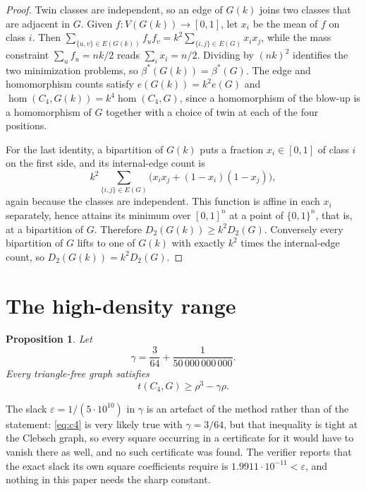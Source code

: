 \documentclass[11pt,reqno]{amsart}
\theoremstyle{plain}
\newtheorem{proposition}[theorem]{Proposition}
\newcommand{\optf}{\beta^{*}}
\newcommand{\dens}{\rho}
\begin{document}
\begin{proof}
Twin classes are independent, so an edge of $G(k)$ joins two classes that are
adjacent in $G$.  Given $f:V(G(k))\to[0,1]$, let $x_i$ be the mean of $f$ on
class $i$.  Then
$\sum_{\{u,v\}\in E(G(k))}f_uf_v=k^{2}\sum_{\{i,j\}\in E(G)}x_ix_j$, while the mass
constraint $\sum_uf_u=nk/2$ reads $\sum_ix_i=n/2$.  Dividing by $(nk)^{2}$
identifies the two minimization problems, so $\optf(G(k))=\optf(G)$.  The edge and
homomorphism counts satisfy $e(G(k))=k^{2}e(G)$ and
$\hom(C_4,G(k))=k^{4}\hom(C_4,G)$, since a
homomorphism of the blow-up is a homomorphism of $G$ together with a choice of
twin at each of the four positions.

For the last identity, a bipartition of $G(k)$ puts a fraction $x_i\in[0,1]$
of class $i$ on the first side, and its internal-edge count is
\[
 k^{2}\sum_{\{i,j\}\in E(G)}\bigl(x_ix_j+(1-x_i)(1-x_j)\bigr),
\]
again because the classes are independent.  This function is affine in each
$x_i$ separately, hence attains its minimum over $[0,1]^{n}$ at a point of
$\{0,1\}^{n}$, that is, at a bipartition of $G$.  Therefore
$D_2(G(k))\ge k^{2}D_2(G)$.  Conversely every bipartition of $G$ lifts to one
of $G(k)$ with exactly $k^{2}$ times the internal-edge count, so
$D_2(G(k))=k^{2}D_2(G)$.
\end{proof}

\section{The high-density range}\label{sec:high}

\begin{proposition}\label{prop:c4}
Let
\[
 \gamma=\frac3{64}+\frac1{50\,000\,000\,000}.
\]
Every triangle-free graph satisfies
\begin{equation}\label{eq:c4}
 t(C_4,G)\ge\dens^{3}-\gamma\dens.
\end{equation}
\end{proposition}

The slack $\varepsilon=1/(5\cdot10^{10})$ in $\gamma$ is an artefact of the
method rather than of the statement: \eqref{eq:c4} is very likely true with
$\gamma=3/64$, but that inequality is tight at the Clebsch graph, so every
square occurring in a certificate for it would have to vanish there as well,
and no such certificate was found.
The verifier reports that the exact slack its own square coefficients require
is $1.9911\cdot10^{-11}<\varepsilon$, and nothing in this paper needs the
sharp constant.
\end{document}
